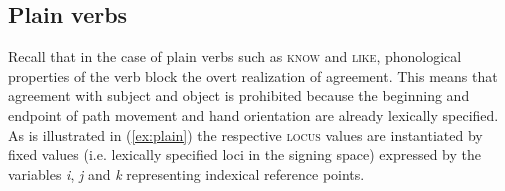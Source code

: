 \documentclass[11pt,a4paper,fleqn]{article}
\begin{document}
\begin{exe}
\ex  \label{ex:inviteagree}

\end{exe}


\subsection{Plain verbs}
Recall that in the case of plain verbs such as \textsc{know} and \textsc{like}, phonological properties of the verb block the overt realization of agreement. This means that agreement with subject and object is prohibited because the beginning and endpoint of path movement and hand orientation are already lexically specified. As is illustrated in (\ref{ex:plain}) the respective \textsc{locus} values are instantiated by fixed values (i.e. lexically specified loci in the signing space) expressed by the variables \textit{i}, \textit{j} and \textit{k} representing indexical reference points.   


\begin{exe}
\ex  \label{ex:plain}
\end{exe}
\end{document}
